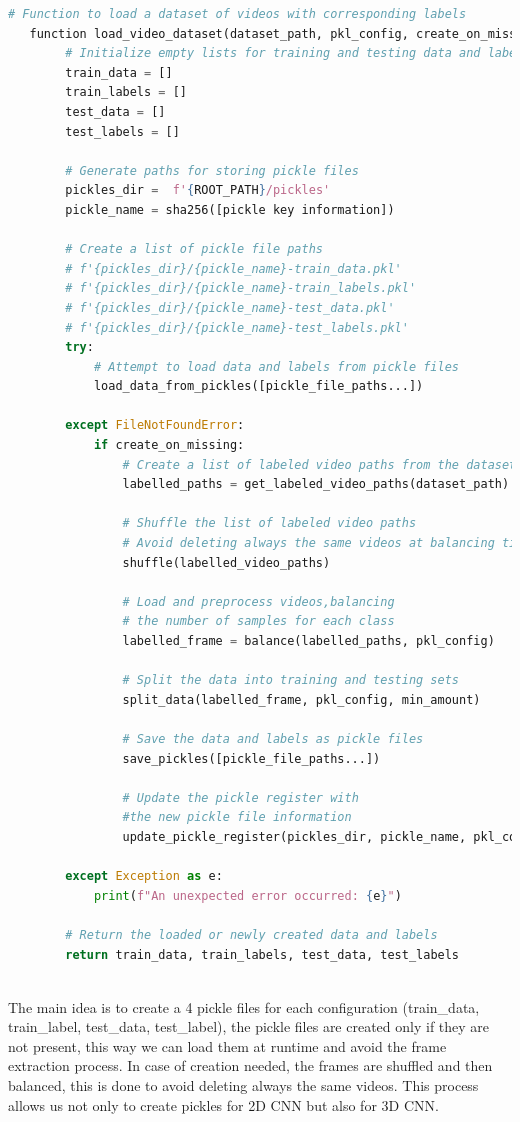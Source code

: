 \begin{lstlisting}[language=python, caption={Pickles generation}, label={lst:PicklesGeneration}]
    # Function to load a dataset of videos with corresponding labels
   function load_video_dataset(dataset_path, pkl_config, create_on_missing):
        # Initialize empty lists for training and testing data and labels
        train_data = []
        train_labels = []
        test_data = []
        test_labels = []
    
        # Generate paths for storing pickle files
        pickles_dir =  f'{ROOT_PATH}/pickles'
        pickle_name = sha256([pickle key information])
    
        # Create a list of pickle file paths
        # f'{pickles_dir}/{pickle_name}-train_data.pkl'
        # f'{pickles_dir}/{pickle_name}-train_labels.pkl'
        # f'{pickles_dir}/{pickle_name}-test_data.pkl'
        # f'{pickles_dir}/{pickle_name}-test_labels.pkl'
        try:
            # Attempt to load data and labels from pickle files
            load_data_from_pickles([pickle_file_paths...])
    
        except FileNotFoundError:
            if create_on_missing:
                # Create a list of labeled video paths from the dataset
                labelled_paths = get_labeled_video_paths(dataset_path)
    
                # Shuffle the list of labeled video paths
                # Avoid deleting always the same videos at balancing time
                shuffle(labelled_video_paths)
    
                # Load and preprocess videos,balancing
                # the number of samples for each class
                labelled_frame = balance(labelled_paths, pkl_config)
    
                # Split the data into training and testing sets
                split_data(labelled_frame, pkl_config, min_amount)
    
                # Save the data and labels as pickle files
                save_pickles([pickle_file_paths...])
    
                # Update the pickle register with 
                #the new pickle file information
                update_pickle_register(pickles_dir, pickle_name, pkl_config)
    
        except Exception as e:
            print(f"An unexpected error occurred: {e}")
    
        # Return the loaded or newly created data and labels
        return train_data, train_labels, test_data, test_labels
    

\end{lstlisting}
The main idea is to create a 4 pickle files for each configuration (train\_data, train\_label, test\_data, test\_label), the pickle files are created only if they are not present, this way we can load them at runtime and avoid the frame extraction process. In case of creation needed, the frames are shuffled and then balanced, this is done to avoid deleting always the same videos. This process allows us not only to create pickles for 2D CNN but also for 3D CNN.


